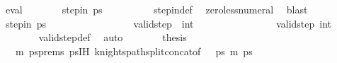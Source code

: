 \begin{isabellebody}
\ eval{\isacharplus}{\kern0pt}\isanewline
\ \ \ \ \isamarkupfalse%
\ \isamarkupfalse%
\ {\isachardoublequoteopen}step{\isacharunderscore}{\kern0pt}in\ {\isacharquery}{\kern0pt}ps\ {\isacharparenleft}{\kern0pt}{}{\isacharcomma}{\kern0pt}{}{\isacharparenright}{\kern0pt}\ {\isacharparenleft}{\kern0pt}{}{\isacharcomma}{\kern0pt}{}{\isacharparenright}{\kern0pt}{\isachardoublequoteclose}\isanewline
\ \ \ \ \ \ \isamarkupfalse%
\ step{\isacharunderscore}{\kern0pt}in{\isacharunderscore}{\kern0pt}def\ \isamarkupfalse%
\ zero{\isacharunderscore}{\kern0pt}less{\isacharunderscore}{\kern0pt}numeral\ \isamarkupfalse%
\ blast\isanewline
\ \ \ \ \isamarkupfalse%
\ \isamarkupfalse%
\ {\isachardoublequoteopen}step{\isacharunderscore}{\kern0pt}in\ {\isacharquery}{\kern0pt}ps\ {\isacharparenleft}{\kern0pt}{}{\isacharcomma}{\kern0pt}{}{\isacharparenright}{\kern0pt}\ {\isacharparenleft}{\kern0pt}{}{\isacharcomma}{\kern0pt}{}{\isacharparenright}{\kern0pt}{\isachardoublequoteclose}\ \isanewline
\ \ \ \ \ \ \ \ \ \ \ \ \ \ {\isachardoublequoteopen}valid{\isacharunderscore}{\kern0pt}step\ {\isacharparenleft}{\kern0pt}{}{\isacharcomma}{\kern0pt}{}{\isacharparenright}{\kern0pt}\ {\isacharparenleft}{\kern0pt}{}{\isacharcomma}{\kern0pt}int\ {}{\isacharplus}{\kern0pt}{}{\isacharparenright}{\kern0pt}{\isachardoublequoteclose}\ \isanewline
\ \ \ \ \ \ \ \ \ \ \ \ \ \ {\isachardoublequoteopen}valid{\isacharunderscore}{\kern0pt}step\ {\isacharparenleft}{\kern0pt}{}{\isacharcomma}{\kern0pt}int\ {}{\isacharplus}{\kern0pt}{}{\isacharparenright}{\kern0pt}\ {\isacharparenleft}{\kern0pt}{}{\isacharcomma}{\kern0pt}{}{\isacharparenright}{\kern0pt}{\isachardoublequoteclose}\isanewline
\ \ \ \ \ \ \isamarkupfalse%
\ valid{\isacharunderscore}{\kern0pt}step{\isacharunderscore}{\kern0pt}def\ \isamarkupfalse%
\ auto\isanewline
\ \ \ \ \isamarkupfalse%
\ \isamarkupfalse%
\ {\isacharquery}{\kern0pt}thesis\isanewline
\ \ \ \ \ \ \isamarkupfalse%
\ {\isacartoucheopen}{}\ {\isasymle}\ m{\isacharminus}{\kern0pt}{}{\isacartoucheclose}\ psprems\ psIH\ knights{\isacharunderscore}{\kern0pt}path{\isacharunderscore}{\kern0pt}split{\isacharunderscore}{\kern0pt}concat{\isacharbrackleft}{\kern0pt}of\ {}\ {}\ {\isacharquery}{\kern0pt}ps\ {\isachardoublequoteopen}m{\isacharminus}{\kern0pt}{}{\isachardoublequoteclose}\ ps\ \isamarkupfalse%

\end{isabellebody}
